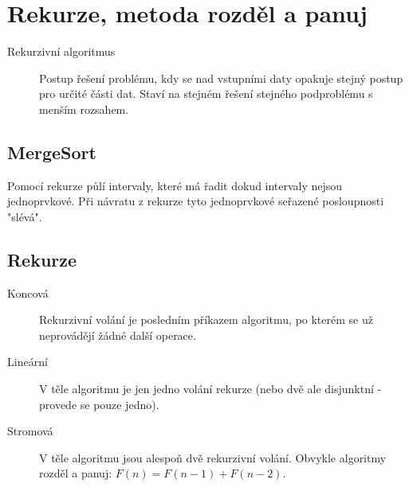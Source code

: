 \section{Rekurze, metoda rozděl a panuj}
  \begin{description}
    \item[Rekurzivní algoritmus] Postup řešení problému, kdy se nad vstupními daty opakuje stejný postup pro určité části dat. Staví na stejném řešení stejného podproblému s menším rozsahem.
  \end{description}

  \subsection{MergeSort}
    Pomocí rekurze půlí intervaly, které má řadit dokud intervaly nejsou jednoprvkové. Při návratu z rekurze tyto jednoprvkové seřazené posloupnosti "slévá".

  \subsection{Rekurze}
    \begin{description}
      \item[Koncová] Rekurzivní volání je posledním příkazem algoritmu, po kterém se už neprovádějí žádné další operace.
      \item[Lineární] V těle algoritmu je jen jedno volání rekurze (nebo dvě ale disjunktní - provede se pouze jedno).
      \item[Stromová] V těle algoritmu jsou alespoň dvě rekurzivní volání. Obvykle algoritmy rozděl a panuj: $F(n) = F(n-1) + F(n-2)$.
    \end{description}
